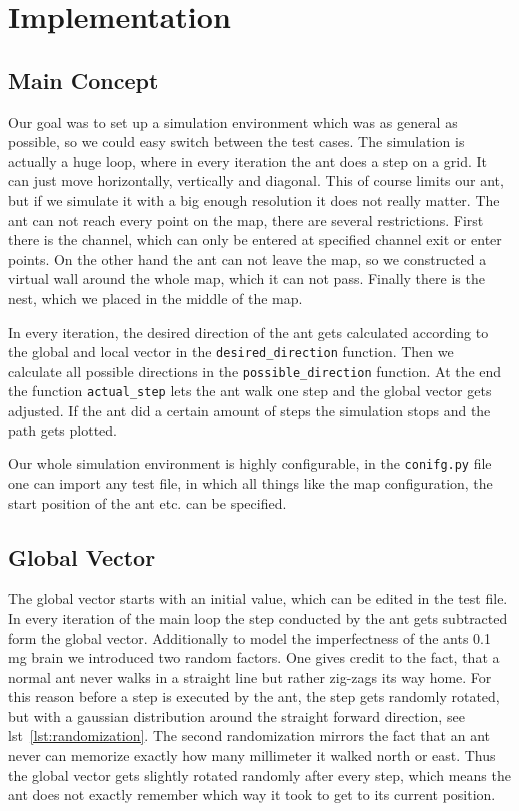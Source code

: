 \documentclass[11pt]{article}
\begin{document}
\section{Implementation} %
	\subsection{Main Concept}
		Our goal was to set up a simulation environment which was as general as possible, so we could easy switch between the test cases. The simulation is actually a huge loop, where in every iteration the ant does a step on a grid. It can just move horizontally, vertically and diagonal. This of course limits our ant, but if we simulate it with a big enough resolution it does not really matter. The ant can not reach every point on the map, there are several restrictions. First there is the channel, which can only be entered at specified channel exit or enter points. On the other hand the ant can not leave the map, so we constructed a virtual wall around the whole map, which it can not pass. Finally there is the nest, which we placed in the middle of the map.

In every iteration, the desired direction of the ant gets calculated according to the global and local vector in the \texttt{desired\_direction} function. Then we calculate all possible directions in the \texttt{possible\_direction} function. At the end the function \texttt{actual\_step} lets the ant walk one step and the global vector gets adjusted. If the ant did a certain amount of steps the simulation stops and the path gets plotted.

Our whole simulation environment is highly configurable, in the \texttt{conifg.py} file one can import any test file, in which all things like the map configuration, the start position of the ant etc. can be specified.
	\subsection{Global Vector}
		The global vector starts with an initial value, which can be edited in the test file. In every iteration of the main loop the step conducted by the ant gets subtracted form the global vector. Additionally to model the imperfectness of the ants 0.1 mg brain we introduced two random factors. One gives credit to the fact, that a normal ant never walks in a straight line but rather zig-zags its way home. For this reason before a step is executed by the ant, the step gets randomly rotated, but with a gaussian distribution around the straight forward direction, see lst~\vref{lst:randomization}. The second randomization mirrors the fact that an ant never can memorize exactly how many millimeter it walked north or east. Thus the global vector gets slightly rotated randomly after every step, which means the ant does not exactly remember which way it took to get to its current position.
		
\end{document}
